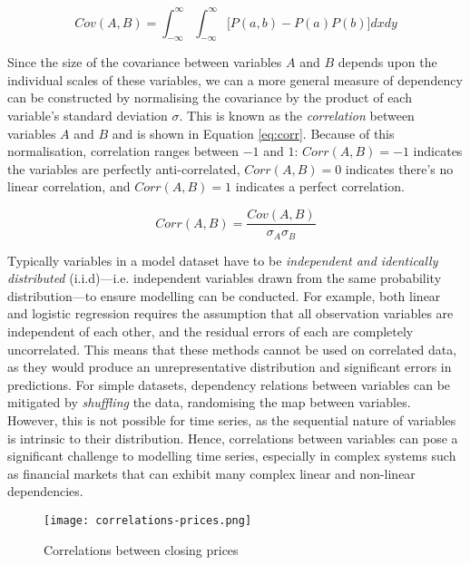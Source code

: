 \documentclass[a4paper, 11pt]{article}
\begin{document}
    \begin{equation}
        Cov(A, B) = \int_{-\infty}^{\infty} \int_{-\infty}^{\infty} \big[P \left(a, b \right) - P\left(a\right) P\left(b\right) \big] dxdy
        \label{eq:cov}
    \end{equation}

    Since the size of the covariance between variables $A$ and $B$ depends upon the individual scales of these variables, we can a more general measure of dependency can be constructed by normalising the covariance by the product of each variable's standard deviation $\sigma$. This is known as the \emph{correlation} between variables $A$ and $B$ and is shown in Equation \ref{eq:corr}. Because of this normalisation, correlation ranges between $-1$ and $1$: $Corr(A, B) = -1$ indicates the variables are perfectly anti-correlated, $Corr(A, B) = 0$ indicates there's no linear correlation, and $Corr(A, B) = 1$ indicates a perfect correlation.

    \begin{equation}
        Corr(A, B) = \frac{Cov(A, B)}{\sigma_A \sigma_B}
        \label{eq:corr}
    \end{equation}

    Typically variables in a model dataset have to be \emph{independent and identically distributed} (i.i.d)---i.e. independent variables drawn from the same probability distribution---to ensure modelling can be conducted. For example, both linear and logistic regression requires the assumption that all observation variables are independent of each other, and the residual errors of each are completely uncorrelated. This means that these methods cannot be used on correlated data, as they would produce an unrepresentative distribution and significant errors in predictions. For simple datasets, dependency relations between variables can be mitigated by \emph{shuffling} the data, randomising the map between variables. However, this is not possible for time series, as the sequential nature of variables is intrinsic to their distribution. Hence, correlations between variables can pose a significant challenge to modelling time series, especially in complex systems such as financial markets that can exhibit many complex linear and non-linear dependencies. 

    \begin{wrapfigure}{l}{0.5\textwidth}
        \caption{Correlations between closing prices}
        \texttt{[image: correlations-prices.png]}
        \label{fig:corr-prices}
    \end{wrapfigure}
\end{document}
